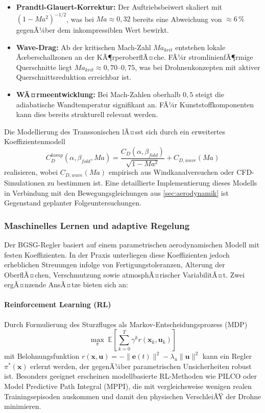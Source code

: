 ﻿\documentclass[12pt,a4paper]{article}
\theoremstyle{remark}
\begin{document}
	\begin{itemize}
		\item \textbf{Prandtl-Glauert-Korrektur:} Der Auftriebsbeiwert skaliert mit $(1 - Ma^2)^{-1/2}$, was bei $Ma \approx 0{,}32$ bereits eine Abweichung von $\approx 6\,\%$ gegenÃ¼ber dem inkompressiblen Wert bewirkt.
		\item \textbf{Wave-Drag:} Ab der kritischen Mach-Zahl $Ma_{krit}$ entstehen lokale Ãœberschallzonen an der KÃ¶rperoberflÃ¤che. FÃ¼r stromlinienfÃ¶rmige Querschnitte liegt $Ma_{krit} \approx 0{,}70$--$0{,}75$, was bei Drohnenkonzepten mit aktiver Querschnittsreduktion erreichbar ist.
		\item \textbf{WÃ¤rmeentwicklung:} Bei Mach-Zahlen oberhalb $0{,}5$ steigt die adiabatische Wandtemperatur signifikant an. FÃ¼r Kunststoffkomponenten kann dies bereits strukturell relevant werden.
	\end{itemize}

	Die Modellierung des Transsonischen lÃ¤sst sich durch ein erweitertes Koeffizientenmodell
	\begin{equation}
		C_D^{komp}(\alpha, \beta_{fold}, Ma) = \frac{C_D(\alpha, \beta_{fold})}{\sqrt{1 - Ma^2}} + C_{D,wave}(Ma)
	\end{equation}
	realisieren, wobei $C_{D,wave}(Ma)$ empirisch aus Windkanalversuchen oder CFD-Simulationen zu bestimmen ist. Eine detaillierte Implementierung dieses Modells in Verbindung mit den Bewegungsgleichungen aus \cref{sec:aerodynamik} ist Gegenstand geplanter Folgeuntersuchungen.

	\subsubsection{Maschinelles Lernen und adaptive Regelung}

	Der BGSG-Regler basiert auf einem parametrischen aerodynamischen Modell mit festen Koeffizienten. In der Praxis unterliegen diese Koeffizienten jedoch erheblichen Streuungen infolge von Fertigungstoleranzen, Alterung der OberflÃ¤chen, Verschmutzung sowie atmosphÃ¤rischer VariabilitÃ¤t. Zwei ergÃ¤nzende AnsÃ¤tze bieten sich an:

	\paragraph{Reinforcement Learning (RL)} Durch Formulierung des Sturzfluges als Markov-Entscheidungsprozess (MDP)
	\begin{equation}
		\max_{\pi} \; \mathbb{E}\left[\sum_{k=0}^{T} \gamma^k r(\mathbf{x}_k, \mathbf{u}_k)\right]
	\end{equation}
	mit Belohnungsfunktion $r(\mathbf{x}, \mathbf{u}) = -\|\mathbf{e}(t)\|^2 - \lambda_u \|\mathbf{u}\|^2$ kann ein Regler $\pi^*(\mathbf{x})$ erlernt werden, der gegenÃ¼ber parametrischen Unsicherheiten robust ist. Besonders geeignet erscheinen modellbasierte RL-Methoden wie PILCO oder Model Predictive Path Integral (MPPI), die mit vergleichsweise wenigen realen Trainingsepisoden auskommen und damit den physischen VerschleiÃŸ der Drohne minimieren.
\end{document}
